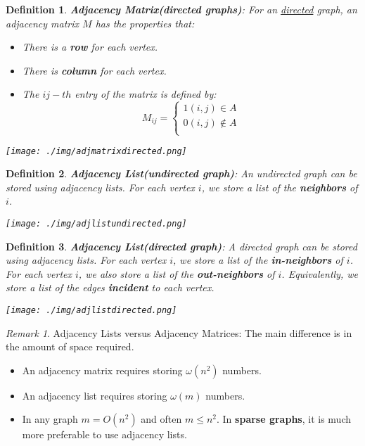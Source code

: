 \documentclass[11pt, a4paper, oneside]{book}
\theoremstyle{theoremdd}
\newtheorem*{definition}{Definition}
\theoremstyle{remark}
\newtheorem*{remark}{Remark}
\begin{document}
\begin{definition}
\textbf{Adjacency Matrix(directed graphs)}: For an \underline{directed} graph, an adjacency matrix $M$ has the properties that: 
\begin{itemize}
\item There is a \textbf{row} for each vertex.
\item There is \textbf{column} for each vertex.
\item The $ij-th$ entry of the matrix is defined by: \\
\[
M_{ij} = \begin{cases}
          1 (i,j) \in A \\
          0 (i,j) \notin A \\
         \end{cases}
\]
\end{itemize} 
\begin{center}
\texttt{[image: ./img/adjmatrixdirected.png]}
\end{center}
\end{definition}

\begin{definition}
\textbf{Adjacency List(undirected graph)}: An undirected graph can be stored using adjacency lists. For each vertex $i$, we store a list of the \textbf{neighbors} of $i$. 
\begin{center}
\texttt{[image: ./img/adjlistundirected.png]}
\end{center}
\end{definition}


\begin{definition}
\textbf{Adjacency List(directed graph)}: A directed graph can be stored using adjacency lists. For each vertex $i$, we store a list of the \textbf{in-neighbors} of $i$. For each vertex $i$, we also store a list of the \textbf{out-neighbors} of $i$. Equivalently, we store a list of the edges \textbf{incident} to each vertex.
\begin{center}
\texttt{[image: ./img/adjlistdirected.png]}
\end{center}
\end{definition}

\begin{remark}
Adjacency Lists versus Adjacency Matrices: The main difference is in the amount of space required. 
\begin{itemize}
\item An adjacency matrix requires storing $\omega (n^2)$ numbers. 
\item An adjacency list requires storing $\omega (m)$ numbers. 
\item In any graph $m=O(n^2)$ and often $m \leq n^2$. \Rightarrow In \textbf{sparse graphs}, it is much more preferable to use adjacency lists. 
\end{itemize}
\end{remark}
\end{document}
